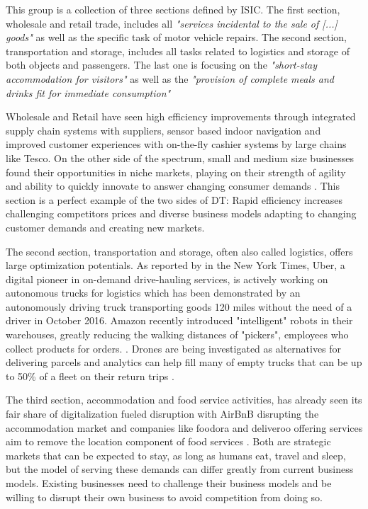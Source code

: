 This group is a collection of three sections defined by \ac{ISIC}. The first section, wholesale and retail trade, includes all \emph{"services incidental to the sale of [...] goods"}\cite[p.179]{ISIC:2008} as well as the specific task of motor vehicle repairs. The second section, transportation and storage, includes all tasks related to logistics and storage of both objects and passengers.\cite[p.194]{ISIC:2008} The last one is focusing on the \emph{"short-stay accommodation for visitors"} as well as the \emph{"provision of complete meals and drinks fit for immediate consumption"}\cite[p.202]{ISIC:2008}

Wholesale and Retail have seen high efficiency improvements through integrated supply chain systems with suppliers, sensor based indoor navigation and improved customer experiences with on-the-fly cashier systems \cite{tescoretail:2015, iicretailbrick:2016} by large chains like Tesco. On the other side of the spectrum, small and medium size businesses found their opportunities in niche markets, playing on their strength of agility and ability to quickly innovate to answer changing consumer demands \cite{pwcretailrenaissance:2016}. This section is a perfect example of the two sides of \ac{DT}: Rapid efficiency increases challenging competitors prices and diverse business models adapting to changing customer demands and creating new markets. 

The second section, transportation and storage, often also called logistics, offers large optimization potentials. As reported by \citeauthor{nytimesdrivingtruck:2016} in the New York Times, Uber, a digital pioneer in on-demand drive-hauling services, is actively working on autonomous trucks for logistics which has been demonstrated by an autonomously driving truck transporting goods 120 miles without the need of a driver in October 2016. Amazon recently introduced "intelligent" robots in their warehouses, greatly reducing the walking distances of "pickers", employees who collect products for orders. \cite{Kiva:amazon:Ma:2016:OTA:2936924.2937092}. Drones are being investigated as alternatives for delivering parcels and analytics can help fill many of empty trucks that can be up to 50\% of a fleet on their return trips \cite{worldforumlogistics:2016}.

The third section, accommodation and food service activities, has already seen its fair share of digitalization fueled disruption with AirBnB disrupting the accommodation market and companies like foodora and deliveroo offering services aim to remove the location component of food services \cite{bloombergfoodora:2016}. Both are strategic markets that can be expected to stay, as long as humans eat, travel and sleep, but the model of serving these demands can differ greatly from current business models. Existing businesses need to challenge their business models and be willing to disrupt their own business to avoid competition from doing so.

